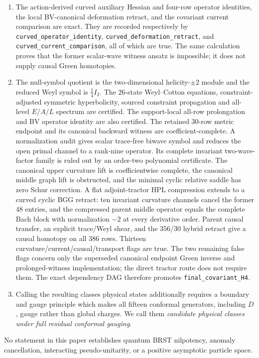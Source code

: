 \documentclass[11pt]{article}
\theoremstyle{definition}
\theoremstyle{remark}
\begin{document}
\begin{enumerate}
$E/A/L$ towers.  Their field-action residues determine a branch
Cauchy--Sobolev space Krein-unitarily equivalent to the completed
one-particle module.  This reduced theorem is not yet a Green's witness for
the complete BV complex.
\item The action-derived curved auxiliary Hessian and four-row operator
identities, the local BV-canonical deformation retract, and the covariant
current comparison are exact.  They are recorded respectively by
\texttt{curved\_operator\_identity},
\texttt{curved\_deformation\_retract}, and
\texttt{curved\_current\_comparison}, all of which are true.  The same
calculation proves that the former scalar-wave witness ansatz is impossible;
it does not supply causal Green homotopies.
\item The null-symbol quotient is the two-dimensional helicity-$\pm2$
module and the reduced Weyl symbol is $\frac14 I_2$.  The $26$-state
Weyl--Cotton equations, constraint-adjusted symmetric hyperbolicity, sourced
constraint propagation and all-level $E/A/L$ spectrum are certified.  The
support-local all-row prolongation and BV operator identity are also certified.
The retained $30$-row metric endpoint and its canonical backward witness are
coefficient-complete.  A normalization audit gives scalar trace-free biwave
symbol and reduces the open primal channel to a rank-nine operator.  Its
complete invariant two-wave-factor family is ruled out by an
order-two polynomial certificate.  The canonical upper curvature lift is
coefficientwise complete, the canonical middle graph lift is obstructed, and the minimal cyclic
relative saddle has zero Schur correction.  A flat adjoint-tractor HPL
compression extends to a curved cyclic BGG retract: ten invariant
curvature channels cancel the former $48$ entries, and the compressed parent
middle operator equals the complete Bach block with normalization $-2$ at
every derivative order.  Parent causal transfer, an explicit trace/Weyl
shear, and the $356/30$ hybrid retract give a causal homotopy on all $386$
rows.  Thirteen curvature/current/causal/transport flags are true.  The two
remaining false flags concern only the superseded canonical endpoint Green
inverse and prolonged-witness implementation; the direct tractor route does
not require them.  The exact dependency DAG therefore promotes
\texttt{final\_covariant\_H4}.
\item Calling the resulting classes physical states additionally requires a
boundary and gauge principle which makes all fifteen conformal generators,
including $D$, gauge rather than global charges.  We call them
\emph{candidate physical classes under full residual conformal gauging}.
\end{enumerate}
No statement in this paper establishes quantum BRST nilpotency, anomaly
cancellation, interacting pseudo-unitarity, or a positive asymptotic
particle space.
\end{document}
